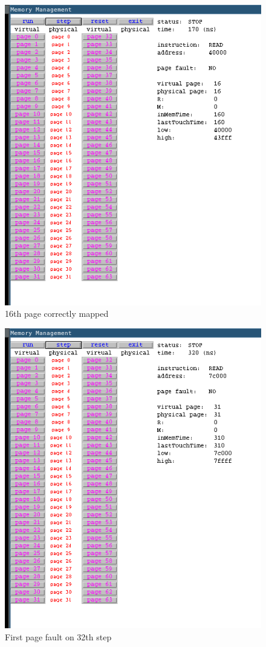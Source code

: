 \documentclass{article}
\begin{document}
\begin{figure}[H]
        \caption{16th page correctly mapped}                                            
	\includegraphics[width=\linewidth]{mm3}
\end{figure}
\begin{figure}[H]
        \caption{First page fault on 32th step}                                            
	\includegraphics[width=\linewidth]{mm4}
\end{figure}
\end{document}

